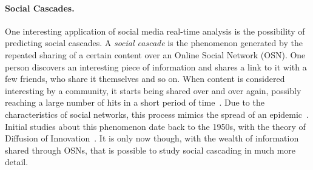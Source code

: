 % 
% 
% 
% 
% 
% 
% 
% 
% 
% 
% 
% 
% 
\paragraph{Social Cascades.} One interesting application of social media real-time analysis is the
possibility of predicting social cascades. A \emph{social cascade} is the phenomenon generated by the
repeated sharing of a certain content over an Online Social Network (OSN). One person discovers an
interesting piece of information and shares a link to it with a few friends, who share it themselves and
so on. When content is considered interesting by a community, it starts being shared over and over again,
possibly reaching a large number of hits in a short period of time~\cite{socialcascade-flickr}. Due to the
characteristics of social networks, this process mimics the spread of an epidemic~\cite{buzztraq}.
Initial studies about this phenomenon date back to the 1950s, with the theory
of Diffusion of Innovation~\cite{diffusion-innovation}. It is only now though, with the wealth of
information shared through OSNs, that is possible to study social cascading in much more detail.

